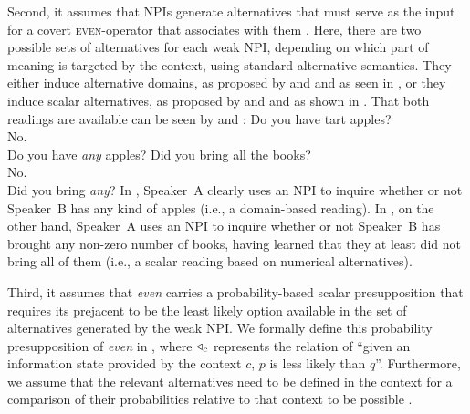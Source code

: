 Second, it assumes that NPIs generate alternatives that must serve as the input for a covert {\scshape even}-operator that associates with them \parencite{Krifka1995,Crnic2011,Crnic2014-dogma,Crnic2014-nm,Chierchia2013}. Here, there are two possible sets of alternatives for each weak NPI, depending on which part of meaning is targeted by the context, using standard  alternative semantics. They either induce alternative domains, as proposed by \textcite{Krifka1995} and \textcite{Chierchia2013} and as seen in , or they induce scalar alternatives, as proposed by \textcite{Lee1994} and \textcite{Lahiri1998} and as shown in .
\ex{}
\resizebox{0.923\linewidth}{!}{}
\xe
\ex{}
\resizebox{0.923\linewidth}{!}{}
\xe
That both readings are available can be seen by  and :
\ex{}
{}Do you have tart apples?\\
No.\\
Do you have \emph{any} apples?\hfill\parencite[p.~14]{Jeong2021}
\xe
\ex{}
{}Did you bring all the books?\\
No.\\
Did you bring \emph{any}?\hfill\parencite[p.~14]{Jeong2021}
\xe
In , Speaker~A clearly uses an NPI to inquire whether or not Speaker~B has any kind of apples (i.e., a domain-based reading). In , on the other hand, Speaker~A uses an NPI to inquire whether or not Speaker~B has brought any non-zero number of books, having learned that they at least did not bring all of them (i.e., a scalar reading based on numerical alternatives).

Third, it assumes that \textit{even} carries a probability-based scalar presupposition that requires its prejacent to be the least likely option available in the set of alternatives generated by the weak NPI. We formally define this probability presupposition of \textit{even} in , where $\triangleleft_c$ represents the relation of \enquote{given an information state provided by the context $c$, $p$ is less likely than $q$}. Furthermore, we assume that the relevant alternatives need to be defined in the context for a comparison of their probabilities relative to that context to be possible \parencite[p.~118]{Crnic2014-dogma}.
\ex{}
{}
\xe

